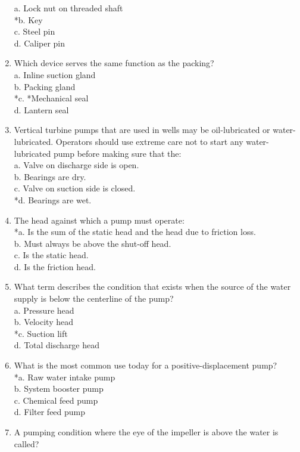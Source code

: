 \begin{enumerate}[1.]
a. Lock nut on threaded shaft\\
*b. Key\\
c. Steel pin\\
d. Caliper pin\\
\item Which device serves the same function as the packing?\\
a. Inline suction gland\\
b. Packing gland\\
*c. *Mechanical seal\\
d. Lantern seal\\
\item Vertical turbine pumps that are used in wells may be oil-lubricated or water-lubricated. Operators should use extreme care not to start any water-lubricated pump before making sure that the:\\
a. Valve on discharge side is open.\\
b. Bearings are dry.\\
c. Valve on suction side is closed.\\
*d. Bearings are wet.\\
\item The head against which a pump must operate:\\
*a. Is the sum of the static head and the head due to friction loss.\\
b. Must always be above the shut-off head.\\
c. Is the static head.\\
d. Is the friction head.\\
\item What term describes the condition that exists when the source of the water supply is below the centerline of the pump?\\
a. Pressure head\\
b. Velocity head\\
*c. Suction lift\\
d. Total discharge head\\
\item What is the most common use today for a positive-displacement pump?\\
*a. Raw water intake pump\\
b. System booster pump\\
c. Chemical feed pump\\
d. Filter feed pump\\
\item A pumping condition where the eye of the impeller is above the water is called?\\

\end{enumerate}
